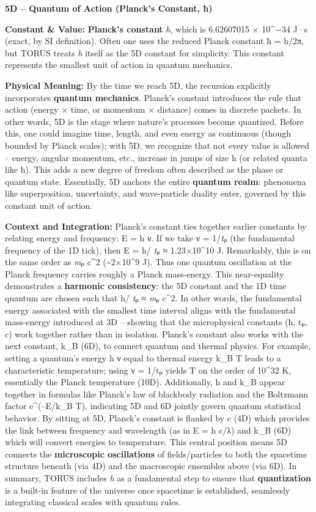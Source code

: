\documentclass[]{article}
\begin{document}
\textbf{5D -- Quantum of Action (Planck's Constant, ħ)}

\textbf{Constant \& Value:} \textbf{Planck's constant} \emph{h}, which
is 6.62607015 × 10\^{}−34 J·s (exact, by SI definition)​. Often one uses
the reduced Planck constant ħ = h/2π, but TORUS treats \emph{h} itself
as the 5D constant for simplicity. This constant represents the smallest
unit of action in quantum mechanics.

\textbf{Physical Meaning:} By the time we reach 5D, the recursion
explicitly incorporates \textbf{quantum mechanics}. Planck's constant
introduces the rule that action (energy × time, or momentum × distance)
comes in discrete packets. In other words, 5D is the stage where
nature's processes become quantized​. Before this, one could imagine
time, length, and even energy as continuous (though bounded by Planck
scales); with 5D, we recognize that not every value is allowed --
energy, angular momentum, etc., increase in jumps of size h (or related
quanta like ħ). This adds a new degree of freedom often described as the
phase or quantum state. Essentially, 5D anchors the entire
\textbf{quantum realm}: phenomena like superposition, uncertainty, and
wave-particle duality enter, governed by this constant unit of action.

\textbf{Context and Integration:} Planck's constant ties together
earlier constants by relating energy and frequency: E = h ν. If we take
ν = 1/\emph{t}ₚ (the fundamental frequency of the 1D tick), then E = h/
\emph{t}ₚ ≈ 1.23×10\^{}10 J​. Remarkably, this is on the same order as
\emph{m}ₚ c\^{}2 (\textasciitilde{}2×10\^{}9 J)​. Thus one quantum
oscillation at the Planck frequency carries roughly a Planck
mass-energy. This near-equality demonstrates a \textbf{harmonic
consistency}: the 5D constant and the 1D time quantum are chosen such
that h/ \emph{t}ₚ ≈ \emph{m}ₚ c\^{}2​. In other words, the fundamental
energy associated with the smallest time interval aligns with the
fundamental mass-energy introduced at 3D -- showing that the
microphysical constants (ħ, tₚ, c) work together rather than in
isolation. Planck's constant also works with the next constant, k\_B
(6D), to connect quantum and thermal physics. For example, setting a
quantum's energy h ν equal to thermal energy k\_B T leads to a
characteristic temperature; using ν = 1/tₚ yields T on the order of
10\^{}32 K, essentially the Planck temperature (10D)​. Additionally, h
and k\_B appear together in formulas like Planck's law of blackbody
radiation and the Boltzmann factor e\^{}(--E/k\_B T), indicating 5D and
6D jointly govern quantum statistical behavior. By sitting at 5D,
Planck's constant is flanked by c (4D) which provides the link between
frequency and wavelength (as in E = h c/λ) and k\_B (6D) which will
convert energies to temperature​. This central position means 5D
connects the \textbf{microscopic oscillations} of fields/particles to
both the spacetime structure beneath (via 4D) and the macroscopic
ensembles above (via 6D). In summary, TORUS includes \emph{h} as a
fundamental step to ensure that \textbf{quantization} is a built-in
feature of the universe once spacetime is established, seamlessly
integrating classical scales with quantum rules.
\end{document}
